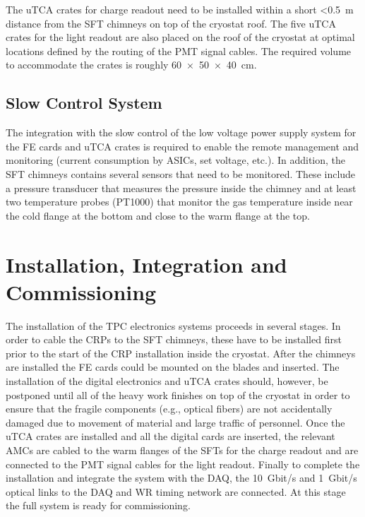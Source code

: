 The uTCA crates for charge readout need to be installed within a short \SI{<0.5}{\meter} distance from the SFT chimneys on top of the cryostat roof. The five uTCA crates for the light readout are also placed on the roof of the cryostat at optimal locations defined by the routing of the PMT signal cables. The required volume to accommodate the crates is roughly \SI[product-units=power]{60x50x40}{\cm}. 

\subsection{Slow Control System}
\label{sec:fddp-tpc-elec-intfc-sc}

The integration with the slow control of the low voltage power supply system for the FE cards and uTCA crates is required to enable the remote management and monitoring (current consumption by ASICs, set voltage, etc.). In addition, the SFT chimneys contains several sensors that need to be monitored. These include a pressure transducer that measures the pressure inside the chimney and at least two temperature probes (PT1000) that monitor the gas temperature inside near the cold flange at the bottom and close to the warm flange at the top.  

\section{Installation, Integration and Commissioning}
\label{sec:fddp-tpc-elec-install}

The installation of the TPC electronics systems proceeds in several stages. In order to cable the CRPs to the SFT chimneys, these have to be installed first prior to the start of the CRP installation inside the cryostat. After the chimneys are installed the FE cards could be mounted on the blades and inserted. The installation of the digital electronics and uTCA crates should, however, be postponed until all of the heavy work finishes on top of the cryostat in order to ensure that the fragile components (e.g., optical fibers) are not accidentally damaged due to movement of material and large traffic of personnel. Once the uTCA crates are installed and all the digital cards are inserted, the relevant AMCs are cabled to the warm flanges of the SFTs for the charge readout and are connected to the PMT signal cables for the light readout. Finally to complete the installation and integrate the system with the DAQ, the \SI{10}{Gbit/s} and \SI{1}{Gbit/s} optical links to the DAQ and WR timing network are connected. At this stage the full system is ready for commissioning. 

